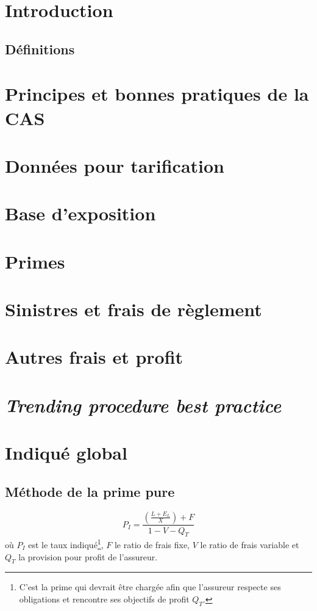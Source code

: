 \documentclass[10pt, french]{article}
\begin{document}
\begin{multicols*}{3} %
\section{Introduction}
\subsection{Définitions}

\section{Principes et bonnes pratiques de la CAS}


\section{Données pour tarification}

\section{Base d'exposition}


\section{Primes}

\section{Sinistres et frais de règlement}

\section{Autres frais et profit}

\section{\textit{Trending procedure best practice}}

\section{Indiqué global}

\subsection{Méthode de la prime pure}
\begin{equation}
P_{I} = \frac{\left( \frac{L + E_L}{X} \right) + F}{1 - V - Q_T}
\end{equation}
où $P_I$ est le taux indiqué\footnote{C'est la prime qui devrait être chargée afin que l'assureur respecte ses obligations et rencontre ses objectifs de profit $Q_T$.}, $F$ le ratio de frais fixe, $V$ le ratio de frais variable et $Q_T$ la provision pour profit de l'assureur.


\end{multicols*}
\end{document}
